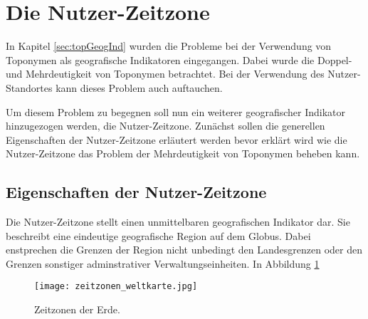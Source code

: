 

	\section{Die Nutzer-Zeitzone}

		In Kapitel \ref{sec:topGeogInd} wurden die Probleme bei der Verwendung von Toponymen als geografische Indikatoren eingegangen.
		Dabei wurde die Doppel- und Mehrdeutigkeit von Toponymen betrachtet.
		Bei der Verwendung des Nutzer-Standortes kann dieses Problem auch auftauchen. 

		Um diesem Problem zu begegnen soll nun ein weiterer geografischer Indikator hinzugezogen werden, die Nutzer-Zeitzone.
		Zunächst sollen die generellen Eigenschaften der Nutzer-Zeitzone erläutert werden bevor erklärt wird wie die Nutzer-Zeitzone das Problem der Mehrdeutigkeit von Toponymen beheben kann.

		\subsection{Eigenschaften der Nutzer-Zeitzone}

			Die Nutzer-Zeitzone stellt einen unmittelbaren geografischen Indikator dar. 
			Sie beschreibt eine eindeutige geografische Region auf dem Globus.
			Dabei enstprechen die Grenzen der Region nicht unbedingt den Landesgrenzen oder den Grenzen sonstiger adminstrativer Verwaltungseinheiten. 
			In Abbildung \ref{img:timezones}

			\begin{figure}[h!]
				\begin{center}
					\texttt{[image: zeitzonen\_weltkarte.jpg]}
					\caption{Zeitzonen der Erde. }

					\label{img:timezones}
				\end{center}
			\end{figure}	

